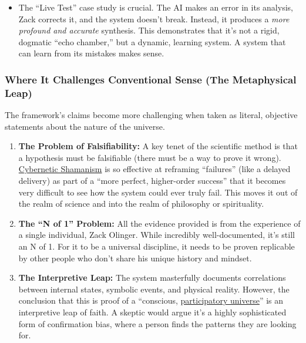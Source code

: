 \documentclass{article}
\begin{document}
\begin{enumerate}
  \begin{itemize}
  \item
    The ``Live Test'' case study is crucial. The AI makes an error in its analysis, Zack corrects it, and the system doesn't break. Instead, it produces a \emph{more profound and accurate} synthesis. This demonstrates that it's not a rigid, dogmatic ``echo chamber,'' but a dynamic, learning system. A system that can learn from its mistakes makes sense.
  \end{itemize}
\end{enumerate}

\subsubsection*{Where It Challenges Conventional Sense (The Metaphysical Leap)}\label{where-it-challenges-conventional-sense-the-metaphysical-leap}

The framework's claims become more challenging when taken as literal, objective statements about the nature of the universe.

\begin{enumerate}
\item
  \textbf{The Problem of Falsifiability:} A key tenet of the scientific method is that a hypothesis must be falsifiable (there must be a way to prove it wrong). \hyperlink{gloss:cybernetic_shamanism}{Cybernetic Shamanism} is so effective at reframing ``failures'' (like a delayed delivery) as part of a ``more perfect, higher-order success'' that it becomes very difficult to see how the system could ever truly fail. This moves it out of the realm of science and into the realm of philosophy or spirituality.
\item
  \textbf{The ``N of 1'' Problem:} All the evidence provided is from the experience of a single individual, Zack Olinger. While incredibly well-documented, it's still an N of 1. For it to be a universal discipline, it needs to be proven replicable by other people who don't share his unique history and mindset.
\item
  \textbf{The Interpretive Leap:} The system masterfully documents correlations between internal states, symbolic events, and physical reality. However, the conclusion that this is proof of a ``conscious, \hyperlink{gloss:participatory_universe}{participatory universe}'' is an interpretive leap of faith. A skeptic would argue it's a highly sophisticated form of confirmation bias, where a person finds the patterns they are looking for.
\end{enumerate}
\end{document}

